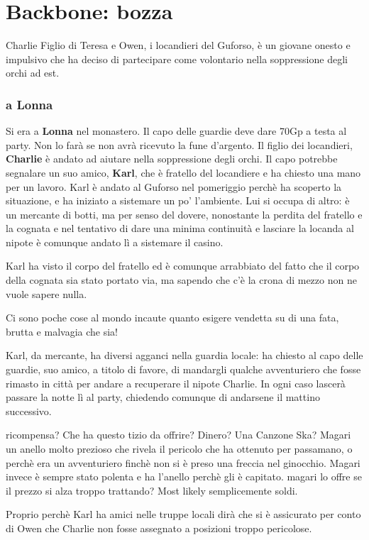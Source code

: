 \documentclass[10pt,twoside, twocolumn, openany]{dndbook}
\begin{document}
\section{Backbone: bozza}

\begin{DndSidebar}[float=b]{Charlie}
  Figlio di Teresa e Owen, i locandieri del Guforso, è un giovane onesto e impulsivo che ha deciso di partecipare come volontario nella soppressione degli orchi ad est. 
\end{DndSidebar}

\subsubsection{a Lonna}
Si era a \textbf{Lonna} nel monastero.
Il capo delle guardie deve dare 70Gp a testa al party. Non lo farà se non avrà ricevuto la fune d'argento. Il figlio dei locandieri, \textbf{Charlie} è andato ad aiutare nella soppressione degli orchi.
Il capo potrebbe segnalare un suo amico, \textbf{Karl}, che è fratello del locandiere e ha chiesto una mano per un lavoro. 
Karl è andato al Guforso nel pomeriggio perchè ha scoperto la situazione, e ha iniziato a sistemare un po' l'ambiente. Lui si occupa di altro: è un mercante di botti, ma per senso del dovere, nonostante la perdita del fratello e la cognata e nel tentativo di dare una minima continuità e lasciare la locanda al nipote è comunque andato lì a sistemare il casino.

Karl ha visto il corpo del fratello ed è comunque arrabbiato del fatto che il corpo della cognata sia stato portato via, ma sapendo che c'è la crona di mezzo non ne vuole sapere nulla.

\begin{DndReadAloud}
  Ci sono poche cose al mondo incaute quanto esigere vendetta su di una fata, brutta e malvagia che sia!
\end{DndReadAloud}

Karl, da mercante, ha diversi agganci nella guardia locale: ha chiesto al capo delle guardie, suo amico, a titolo di favore, di mandargli qualche avventuriero che fosse rimasto in città per andare a recuperare il nipote Charlie. In ogni caso lascerà passare la notte lì al party, chiedendo comunque di andarsene il mattino successivo. 
\begin{DndComment}{ricompensa?}
   Che ha questo tizio da offrire? Dinero? Una Canzone Ska? Magari un anello molto prezioso che rivela il pericolo che ha ottenuto per passamano, o perchè era un avventuriero finchè non si è preso una freccia nel ginocchio.
   Magari invece è sempre stato polenta e ha l'anello perchè gli è capitato. magari lo offre se il prezzo si alza troppo trattando? Most likely semplicemente soldi.
\end{DndComment}
Proprio perchè Karl ha amici nelle truppe locali dirà che si è assicurato per conto di Owen che Charlie non fosse assegnato a posizioni troppo pericolose.
\end{document}

